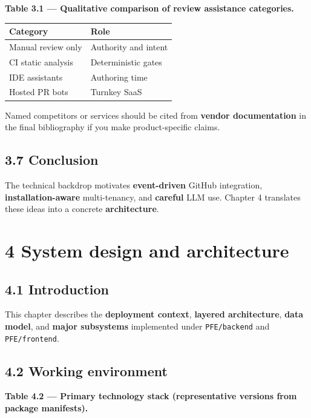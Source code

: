 \documentclass[11pt,a4paper]{report}
\begin{document}
\textbf{Table 3.1 — Qualitative comparison of review assistance categories.}


\begingroup\small
\begin{tabular}{@{}p{}p{}@{}}
\toprule
Category & Role \\
\midrule
Manual review only & Authority and intent \\
CI static analysis & Deterministic gates \\
IDE assistants & Authoring time \\
Hosted PR bots & Turnkey SaaS \\
\bottomrule
\end{tabular}
\endgroup


Named competitors or services should be cited from \textbf{vendor documentation} in the final bibliography if you make product-specific claims.


\section{3.7 Conclusion}


The technical backdrop motivates \textbf{event-driven} GitHub integration, \textbf{installation-aware} multi-tenancy, and \textbf{careful} LLM use. Chapter 4 translates these ideas into a concrete \textbf{architecture}.



\chapter{4 System design and architecture}


\section{4.1 Introduction}


This chapter describes the \textbf{deployment context}, \textbf{layered architecture}, \textbf{data model}, and \textbf{major subsystems} implemented under \texttt{PFE/backend} and \texttt{PFE/frontend}.


\section{4.2 Working environment}


\textbf{Table 4.2 — Primary technology stack (representative versions from package manifests).}
\end{document}
